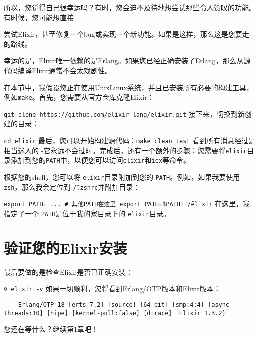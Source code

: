 所以，您觉得自己很幸运吗？有时，您会迫不及待地想尝试那些令人赞叹的功能。有时候，您可能想直接

尝试Elixir，甚至修复一个bug或实现一个新功能。如果是这样，那么这是您要走的路线。

幸运的是，Elixir唯一依赖的是Erlang。如果您已经正确安装了Erlang，那么从源代码编译Elixir通常不会太戏剧性。

在本节中，我假设您正在使用Unix\/Linux系统，并且已安装所有必要的构建工具，例如\texttt{make}。首先，您需要从官方仓库克隆Elixir：

\texttt{git clone https://github.com/elixir-lang/elixir.git}
接下来，切换到新创建的目录：

\texttt{cd elixir} 最后，您可以开始构建源代码：\texttt{make clean test}
看到所有消息经过是相当迷人的 -它永远不会过时。完成后，还有一个额外的步骤：您需要将\texttt{elixir}目录添加到您的\texttt{PATH}中，以便您可以访问\texttt{elixir}和\texttt{iex}等命令。

根据您的shell，您可以将 \texttt{elixir}目录附加到您的 \texttt{PATH}。例如，如果我要使用 \texttt{zsh}，那么我会定位到 \texttt{\~/.zshrc}并附加目录：

 \texttt{export PATH= ... \# 其他PATH在这里 export PATH=\$PATH:"\~/elixir}
在这里，我指定了一个 \texttt{PATH}是位于我的家目录下的 \texttt{elixir}目录。


\section{验证您的Elixir安装}

最后要做的是检查Elixir是否已正确安装：

 \texttt{\% elixir -v}
如果一切顺利，您将看到Erlang/OTP版本和Elixir版本：

\begin{code}{}
\begin{verbatim}
	Erlang/OTP 18 [erts-7.2] [source] [64-bit] [smp:4:4] [async-threads:10] [hipe] [kernel-poll:false] [dtrace]  Elixir 1.3.2}
\end{verbatim}
\end{code}

您还在等什么？继续第1章吧！

\printnotes
